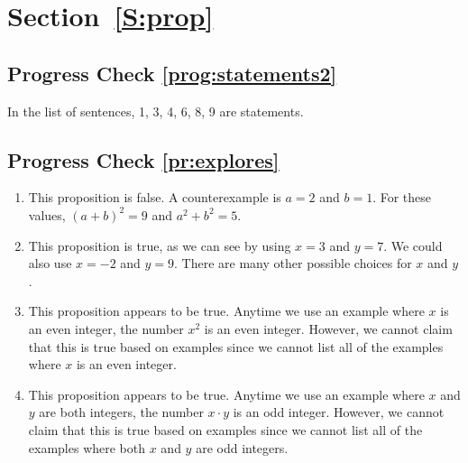\section*{Section~\ref{S:prop}}

\subsection*{Progress Check \ref{prog:statements2}}
In the list of sentences,  1, 3, 4, 6, 8, 9 are statements.

\subsection*{Progress Check \ref{pr:explores}}
\begin{enumerate}
\item %
This proposition is false.  A counterexample is  $a = 2$ and $b = 1$.  For these values,
$\left( {a + b} \right)^2 = 9$ and $a^2 + b^2 = 5$.

\item %
This proposition is true, as we can see by using  $x = 3$ and  $y = 7$.  We could also use  
$x =  -2$ and  $y = 9$.  There are many other possible choices for  $x$  and  $y$.

\item %
This proposition appears to be true.  Anytime we use an example where  $x$  is  an even integer, the number  $x^2$ is an even integer.  However, we cannot claim that this is true based on examples since we cannot list all of the examples where  $x$  is  an even integer.

\item %
This proposition appears to be true.  Anytime we use an example where  $x$ and $y$ are both integers, the number  $x \cdot y$ is an odd integer.  However, we cannot claim that this is true based on examples since we cannot list all of the examples where both $x$ and $y$ are odd integers.
\end{enumerate}


